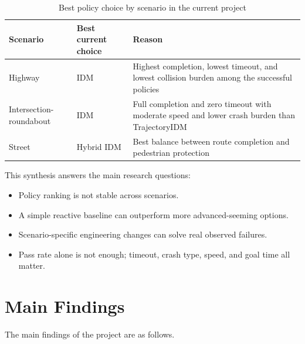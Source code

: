 \documentclass[12pt,a4paper]{report}
\begin{document}
\begin{table}[H]
    \centering
    \small
    \caption{Best policy choice by scenario in the current project}
    \label{tab:best_policy_by_scenario}
    \begin{tabularx}{\textwidth}{>{\raggedright\arraybackslash}p{2.9cm} X X}
        \toprule
        Scenario & Best current choice & Reason \\
        \midrule
        Highway & IDM & Highest completion, lowest timeout, and lowest collision burden among the successful policies \\
        Intersection-roundabout & IDM & Full completion and zero timeout with moderate speed and lower crash burden than TrajectoryIDM \\
        Street & Hybrid IDM & Best balance between route completion and pedestrian protection \\
        \bottomrule
    \end{tabularx}
\end{table}

This synthesis answers the main research questions:

\begin{itemize}
    \item Policy ranking is not stable across scenarios.
    \item A simple reactive baseline can outperform more advanced-seeming options.
    \item Scenario-specific engineering changes can solve real observed failures.
    \item Pass rate alone is not enough; timeout, crash type, speed, and goal time all matter.
\end{itemize}

\section{Main Findings}
The main findings of the project are as follows.
\end{document}
